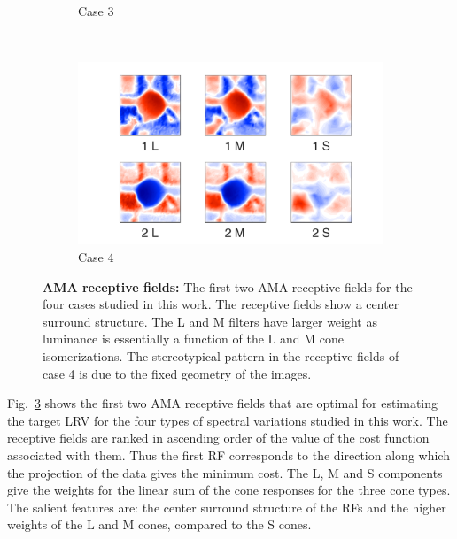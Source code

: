 \documentclass{jov}
\begin{document}
\begin{figure}
\begin{subfigure}{0.21 \textwidth}
	\caption{Case 3}
	\label{fig:case3Filter}
    \end{subfigure}
    ~ ~ ~
        \begin{subfigure}{0.21 \textwidth}
	\includegraphics[width=\textwidth]{../Figures/Figure14/Figure14_d.pdf}
	\caption{Case 4}
	\label{fig:case4Filter}
    \end{subfigure}
\caption{{\bf AMA receptive fields:} The first two AMA receptive fields for the four cases studied in this work. The receptive fields show a center surround structure. The L and M filters have larger weight as luminance is essentially a function of the L and M cone isomerizations. The stereotypical pattern in the receptive fields of case 4 is due to the fixed geometry of the images.}
 \label{fig:AMAFilters}
\end{figure}

Fig.~\ref{fig:AMAFilters} shows the first two AMA receptive fields that are optimal for estimating the target LRV for the four types of spectral variations studied in this work. The receptive fields are ranked in ascending order of the value of the cost function associated with them. Thus the first RF corresponds to the direction along which the projection of the data gives the minimum cost. The L, M and S components give the weights for the linear sum of the cone responses for the three cone types. The salient features are: the center surround structure of the RFs and the higher weights of the L and M cones, compared to the S cones. 
\end{document}
